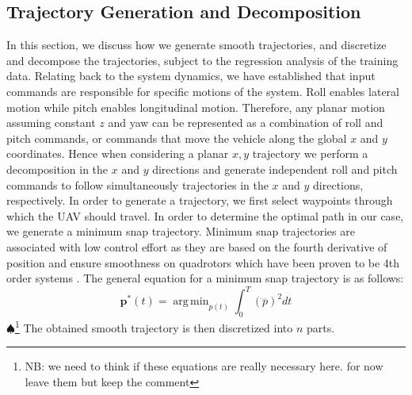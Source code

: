 \documentclass[letterpaper, 10 pt, conference]{ieeeconf}  %
\newcommand\NB[1]{$\spadesuit$\footnote{NB: #1}}
\DeclareMathOperator*{\argmin}{arg\,min}
\begin{document}
\subsection{Trajectory Generation and Decomposition} \label{sec:traj}
In this section, we discuss how we generate smooth trajectories, and discretize and decompose the trajectories, subject to the regression analysis of the training data.
Relating back to the system dynamics, we have established that input commands are responsible for specific motions of the system. Roll enables lateral motion while pitch enables longitudinal motion. Therefore, any planar motion assuming constant $z$ and yaw can be represented as a combination of roll and pitch commands, or commands that move the vehicle along the global $x$ and $y$ coordinates. Hence when considering a planar $x,y$ trajectory we perform a decomposition in the $x$ and $y$ directions and generate independent roll and pitch commands to follow simultaneously trajectories in the $x$ and $y$ directions, respectively. 
In order to generate a trajectory, we first select waypoints through which the UAV should travel. In order to determine the optimal path in our case, we generate a minimum snap trajectory. Minimum snap trajectories are associated with low control effort as they are based on the fourth derivative of position and ensure smoothness on quadrotors which have been proven to be 4th order systems \cite{minsnap}. The general equation for a minimum snap trajectory is as follows:
\begin{equation} \label{eq:minjerkint}
    \bm{p}^*(t) = \argmin_{p(t)}\int_0^T(\ddddot{p})^2dt
\end{equation}
\NB{we need to think if these equations are really necessary here. for now leave them but keep the comment}
The obtained smooth trajectory is then discretized into $n$ parts.
\end{document}

